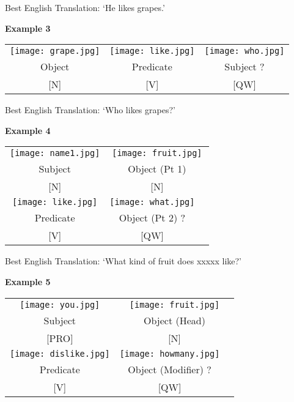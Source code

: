 \documentclass{tufte-book}
\begin{document}
Best English Translation: `He likes grapes.'

\vspace{0.25cm}\noindent \textbf{Example 3}
\begin{table*}[h!]
\begin{tabular}{c | c| c}
\texttt{[image: grape.jpg]}&\texttt{[image: like.jpg]}&\texttt{[image: who.jpg]}\\
\footnotesize Object & \footnotesize Predicate & \footnotesize Subject ?\\
\footnotesize [N] & \footnotesize [V] & \footnotesize [QW]\\
\end{tabular}
\end{table*}

Best English Translation: `Who likes grapes?'

\newpage

\vspace{0.25cm}\noindent \textbf{Example 4}
\begin{table*}[h!]
\begin{tabular}{c | c c}
\texttt{[image: name1.jpg]}&\multicolumn{2}{c}{\texttt{[image: fruit.jpg]}}\\
\footnotesize Subject & \multicolumn{2}{c}{\footnotesize Object (Pt 1)} \\
\footnotesize [N] & \multicolumn{2}{c}{\footnotesize [N]}\\
\texttt{[image: like.jpg]}& \texttt{[image: what.jpg]} &\\
\footnotesize Predicate & \footnotesize Object (Pt 2) ?\\
\footnotesize [V] & \footnotesize [QW]\\
\end{tabular}
\end{table*}

Best English Translation: `What kind of fruit does xxxxx like?'

\vspace{0.25cm}\noindent \textbf{Example 5}
\begin{table*}[h!]
\begin{tabular}{c | c c}
\texttt{[image: you.jpg]}&\multicolumn{2}{c}{\texttt{[image: fruit.jpg]}}\\
\footnotesize Subject & \multicolumn{2}{c}{\footnotesize Object (Head)} \\
\footnotesize [PRO] & \multicolumn{2}{c}{\footnotesize [N]}\\
\texttt{[image: dislike.jpg]}& \texttt{[image: howmany.jpg]} &\\
\footnotesize Predicate & \footnotesize Object (Modifier) ?\\
\footnotesize [V] & \footnotesize [QW]\\
\end{tabular}
\end{table*}
\end{document}
